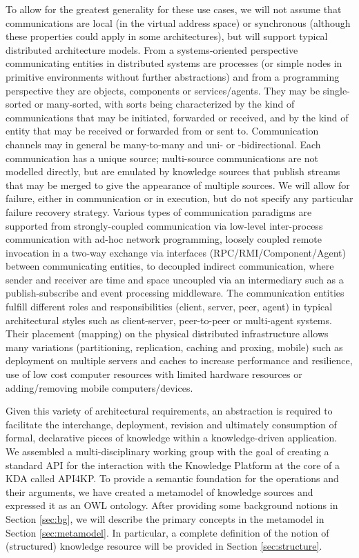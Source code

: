 \documentclass[runningheads]{llncs}
\begin{document}
To allow for the greatest generality for these use cases, we will not assume that communications are local (in the virtual address space) or synchronous (although these properties could apply in some architectures), but will support typical distributed architecture models.  
From a systems-oriented perspective communicating entities in distributed systems are processes (or simple nodes in primitive environments without further abstractions) and from a programming perspective they are objects, components or services/agents. They may be single-sorted or many-sorted, with sorts being characterized by the kind of communications that may be initiated, forwarded or received, and by the kind of entity that may be received or forwarded from or sent to.
Communication channels may in general be many-to-many and uni- or -bidirectional. Each communication has a unique source; multi-source communications are not modelled directly, but are emulated by knowledge sources that publish streams that may be merged to give the appearance of multiple sources. We will allow for failure, either in communication or in execution, but do not specify any particular failure recovery strategy. 
Various types of communication paradigms are supported from strongly-coupled communication via low-level inter-process communication with ad-hoc network programming, loosely coupled remote invocation in a two-way exchange via interfaces  (RPC/RMI/Component/Agent) between communicating entities, to decoupled indirect communication, where sender and receiver are time and space uncoupled via an intermediary such as a publish-subscribe and event processing middleware.
The communication entities fulfill different roles and responsibilities (client, server, peer, agent) in typical architectural styles such as client-server, peer-to-peer or multi-agent systems. Their placement (mapping) on the physical distributed infrastructure allows many variations (partitioning, replication, caching and proxing, mobile) such as deployment on multiple servers and caches to increase performance and resilience, use of low cost computer resources with limited hardware resources or adding/removing mobile computers/devices.

Given this variety of architectural requirements, an abstraction is required to facilitate the interchange, deployment, revision and ultimately consumption of formal, declarative pieces of knowledge within a knowledge-driven application. We assembled a multi-disciplinary working group with the goal of creating a standard API for the interaction with the Knowledge Platform at the core of a KDA called API4KP. %
To provide a semantic foundation for the operations and their arguments, we have created a metamodel of knowledge sources and expressed it as an OWL ontology.
After providing some background notions in Section \ref{sec:bg}, we will describe the primary concepts in the metamodel in Section \ref{sec:metamodel}. In particular, a complete definition of the notion of (structured) knowledge resource will be provided in Section \ref{sec:structure}. 
\end{document}
